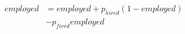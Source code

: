 \documentclass[preview]{standalone}
\begin{document}
\begin{align*}
employed &= employed + p_{hired}(1 - employed)\\ &- p_{fired}employed
\end{align*}
\end{document}
